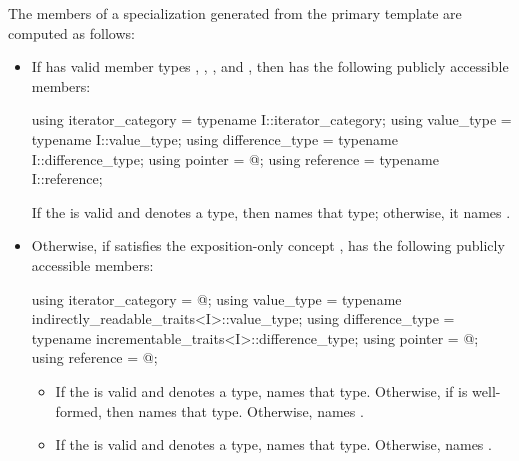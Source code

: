 \pnum
The members of a specialization  generated from the
 primary template are computed as follows:

\begin{itemize}
\item
If  has valid member
types , ,
, and ,
then
has the following publicly accessible members:
\begin{codeblock}
using iterator_category = typename I::iterator_category;
using value_type        = typename I::value_type;
using difference_type   = typename I::difference_type;
using pointer           = @\seebelow@;
using reference         = typename I::reference;
\end{codeblock}
If the   is valid and
denotes a type, then  names that type;
otherwise, it names .

\item
Otherwise, if  satisfies the exposition-only concept
,
 has the following
publicly accessible members:
\begin{codeblock}
using iterator_category = @\seebelow@;
using value_type        = typename indirectly_readable_traits<I>::value_type;
using difference_type   = typename incrementable_traits<I>::difference_type;
using pointer           = @\seebelow@;
using reference         = @\seebelow@;
\end{codeblock}
\begin{itemize}
\item If the   is valid and denotes a type,
 names that type. Otherwise, if
 is well-formed, then
 names that type. Otherwise, 
names .

\item If the   is valid and denotes a
type,  names that type. Otherwise, 
names .


\end{itemize}
\end{itemize}
